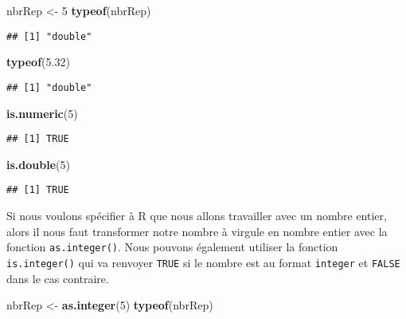 \documentclass[]{book}
\newenvironment{Shaded}{\begin{snugshade}}{\end{snugshade}}
\newcommand{\KeywordTok}[1]{\textcolor[rgb]{0.13,0.29,0.53}{\textbf{#1}}}
\newcommand{\DecValTok}[1]{\textcolor[rgb]{0.00,0.00,0.81}{#1}}
\newcommand{\FloatTok}[1]{\textcolor[rgb]{0.00,0.00,0.81}{#1}}
\newcommand{\StringTok}[1]{\textcolor[rgb]{0.31,0.60,0.02}{#1}}
\newcommand{\NormalTok}[1]{#1}
\theoremstyle{definition}
\theoremstyle{definition}
\theoremstyle{definition}
\theoremstyle{remark}
\begin{document}
\begin{Shaded}
\begin{Highlighting}[]
\NormalTok{nbrRep <-}\StringTok{ }\DecValTok{5}
\KeywordTok{typeof}\NormalTok{(nbrRep)}
\end{Highlighting}
\end{Shaded}

\begin{verbatim}
## [1] "double"
\end{verbatim}

\begin{Shaded}
\begin{Highlighting}[]
\KeywordTok{typeof}\NormalTok{(}\FloatTok{5.32}\NormalTok{)}
\end{Highlighting}
\end{Shaded}

\begin{verbatim}
## [1] "double"
\end{verbatim}

\begin{Shaded}
\begin{Highlighting}[]
\KeywordTok{is.numeric}\NormalTok{(}\DecValTok{5}\NormalTok{)}
\end{Highlighting}
\end{Shaded}

\begin{verbatim}
## [1] TRUE
\end{verbatim}

\begin{Shaded}
\begin{Highlighting}[]
\KeywordTok{is.double}\NormalTok{(}\DecValTok{5}\NormalTok{)}
\end{Highlighting}
\end{Shaded}

\begin{verbatim}
## [1] TRUE
\end{verbatim}

Si nous voulons spécifier à R que nous allons travailler avec un nombre
entier, alors il nous faut transformer notre nombre à virgule en nombre
entier avec la fonction \texttt{as.integer()}. Nous pouvons également
utiliser la fonction \texttt{is.integer()} qui va renvoyer \texttt{TRUE}
si le nombre est au format \texttt{integer} et \texttt{FALSE} dans le
cas contraire.

\begin{Shaded}
\begin{Highlighting}[]
\NormalTok{nbrRep <-}\StringTok{ }\KeywordTok{as.integer}\NormalTok{(}\DecValTok{5}\NormalTok{)}
\KeywordTok{typeof}\NormalTok{(nbrRep)}
\end{Highlighting}
\end{Shaded}
\end{document}

